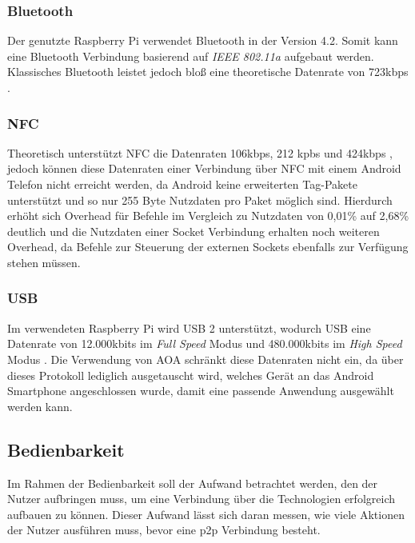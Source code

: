 		\subsubsection{Bluetooth} Der genutzte Raspberry Pi verwendet Bluetooth in der Version 4.2. Somit kann eine Bluetooth Verbindung basierend auf {\it IEEE 802.11a} aufgebaut werden. Klassisches Bluetooth leistet jedoch bloß eine theoretische Datenrate von 723kbps \cite[S.377]{Sauter}.
		
		\subsubsection{NFC} Theoretisch unterstützt NFC die Datenraten 106kbps, 212 kpbs und 424kbps \linebreak \cite{nfcRates}, jedoch können diese Datenraten einer Verbindung über NFC mit einem Android Telefon nicht erreicht werden, da Android keine erweiterten Tag-Pakete unterstützt \cite{nfcBug} und so nur 255 Byte Nutzdaten pro Paket möglich sind. Hierdurch erhöht sich Overhead für Befehle im Vergleich zu Nutzdaten von 0,01\% auf 2,68\% deutlich und die Nutzdaten einer Socket Verbindung erhalten noch weiteren Overhead, da Befehle zur Steuerung der externen Sockets ebenfalls zur Verfügung stehen müssen.
		
		\subsubsection{USB} Im verwendeten Raspberry Pi wird USB 2 unterstützt, wodurch USB eine Datenrate von 12.000kbits im {\it Full Speed} Modus und 480.000kbits im {\it High Speed} Modus \cite[S.36]{axelson}. Die Verwendung von AOA schränkt diese Datenraten nicht ein, da über dieses Protokoll lediglich ausgetauscht wird, welches Gerät an das Android Smartphone angeschlossen wurde, damit eine passende Anwendung ausgewählt werden kann.
		
		\subsection{Bedienbarkeit}
      Im Rahmen der Bedienbarkeit soll der Aufwand betrachtet werden, den der Nutzer aufbringen muss, um eine Verbindung über die Technologien erfolgreich aufbauen zu können. Dieser Aufwand lässt sich daran messen, wie viele Aktionen der Nutzer ausführen muss, bevor eine p2p Verbindung besteht.
      
